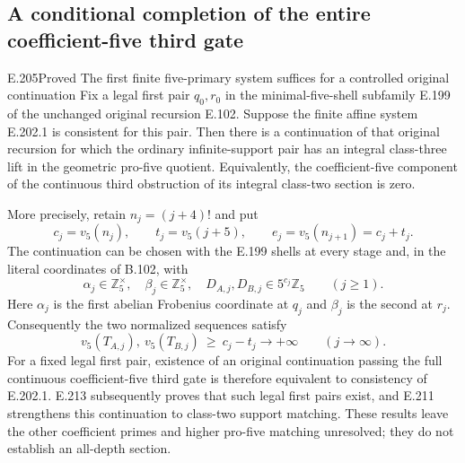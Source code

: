\subsection{A conditional completion of the entire coefficient-five third gate}

\begin{result}{E.205}{Proved}
{The first finite five-primary system suffices for a controlled original continuation}
Fix a legal first pair $q_0,r_0$ in the minimal-five-shell
subfamily E.199 of the unchanged original recursion E.102.
Suppose the finite affine system E.202.1 is consistent for this pair.
Then there is a continuation of that original recursion for which
the ordinary infinite-support pair has an integral class-three lift
in the geometric pro-five quotient.  Equivalently, the coefficient-five
component of the continuous third obstruction of its integral
class-two section is zero.

More precisely, retain $n_j=(j+4)!$ and put
\[
 c_j=v_5(n_j),\qquad t_j=v_5(j+5),\qquad
 e_j=v_5(n_{j+1})=c_j+t_j.
 \tag{E.205.1}
\]
The continuation can be chosen with the E.199 shells at every stage
and, in the literal coordinates of B.102, with
\[
 \alpha_j\in\mathbb Z_5^\times,\quad
 \beta_j\in\mathbb Z_5^\times,\quad
 D_{A,j},D_{B,j}\in5^{c_j}\mathbb Z_5
                         \qquad(j\geq1).
 \tag{E.205.2}
\]
Here $\alpha_j$ is the first abelian Frobenius coordinate at $q_j$
and $\beta_j$ is the second at $r_j$.
Consequently the two normalized sequences satisfy
\[
 v_5(T_{A,j}),\ v_5(T_{B,j})\ \geq\ c_j-t_j
                  \longrightarrow+\infty\qquad(j\longrightarrow\infty).
 \tag{E.205.3}
\]
For a fixed legal first pair, existence of an original continuation
passing the full continuous coefficient-five third gate is therefore
equivalent to consistency of E.202.1. E.213 subsequently proves
that such legal first pairs exist, and E.211 strengthens this
continuation to class-two support matching. These results leave
the other coefficient primes and higher pro-five matching
unresolved; they do not establish an all-depth section.
\end{result}

